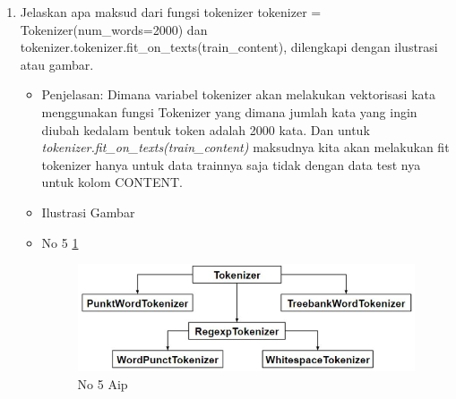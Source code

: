 \begin{enumerate}
\item Jelaskan apa maksud dari fungsi tokenizer {tokenizer = Tokenizer(num\_words=2000)} dan tokenizer.{tokenizer.fit\_on\_texts(train\_content)}, dilengkapi dengan ilustrasi atau gambar.
\begin{itemize}
\item Penjelasan: Dimana variabel tokenizer akan melakukan vektorisasi kata menggunakan fungsi Tokenizer yang dimana jumlah kata yang ingin diubah kedalam bentuk token adalah 2000 kata. Dan untuk \emph{tokenizer.fit\_on\_texts(train\_content)} maksudnya kita akan melakukan fit tokenizer hanya untuk data trainnya saja tidak dengan data test nya untuk kolom CONTENT. 
\par 
\par
\item Ilustrasi Gambar
\item No 5 \ref{teori5}
\begin{figure}[!hbtp]
\centering
\includegraphics[scale=0.4]{figures/AIP/g5.PNG}
\caption{No 5 Aip}
\label{teori5}
\end{figure}
\par
\end{itemize}
\par
\par



\end{enumerate}
